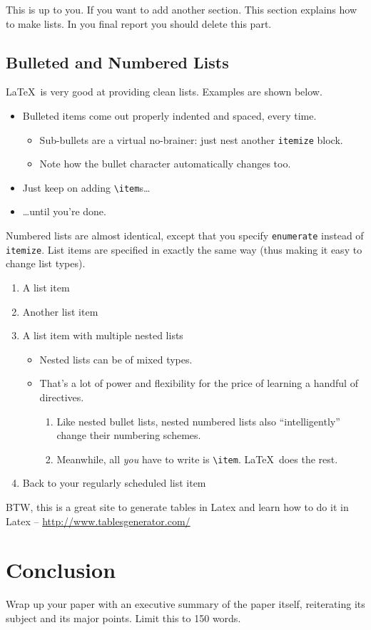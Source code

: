 \documentclass{article}
\begin{document}
This is up to you. If you want to add another section. This section explains how to make lists. In you final report you should delete this part. 

\subsection{Bulleted and Numbered Lists}

\LaTeX\ is very good at providing clean lists.  Examples are shown below.

\begin{itemize}
\item Bulleted items come out properly indented and spaced, every time.

\begin{itemize}
\item Sub-bullets are a virtual no-brainer: just nest another \verb!itemize! block.
\item Note how the bullet character automatically changes too.
\end{itemize}

\item Just keep on adding \verb!\item!s\ldots

\item \ldots until you're done.
\end{itemize}

Numbered lists are almost identical, except that you specify \verb!enumerate! instead of \verb!itemize!.  List items are specified in exactly the same way (thus making it easy to change list types).

\begin{enumerate}
\item A list item
\item Another list item
\item A list item with multiple nested lists

\begin{itemize}
\item Nested lists can be of mixed types.
\item That's a lot of power and flexibility for the price of learning a handful of directives.

\begin{enumerate}
\item Like nested bullet lists, nested numbered lists also ``intelligently'' change their numbering schemes.
\item Meanwhile, all \emph{you} have to write is \verb!\item!.  \LaTeX\ does the rest.
\end{enumerate}
\end{itemize}

\item Back to your regularly scheduled list item

\end{enumerate}

BTW, this is a great site to generate tables in Latex and learn how to do it in Latex -- \url{http://www.tablesgenerator.com/}

\section{Conclusion}

Wrap up your paper with an executive summary of the paper itself, reiterating its subject and its major points. Limit this to 150 words.
\end{document}
